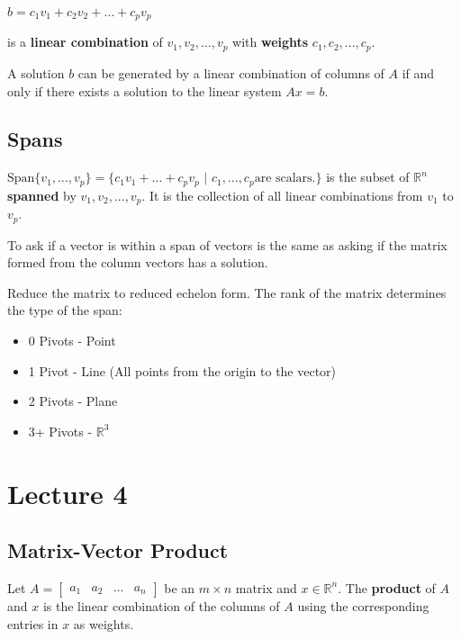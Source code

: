 \documentclass[12pt, letterpaper]{article}
\begin{document}
\medskip
{\centering

  $ b = c_1v_1 + c_2v_2 + \hdots + c_pv_p $

}
\medskip

is a \textbf{linear combination} of $ v_1, v_2, \hdots , v_p $ with
\textbf{weights} $ c_1, c_2, ... , c_p $.

\bigskip

A solution $ b $ can be generated by a linear combination of columns
of $ A $ if and only if there exists a solution to the linear system $ Ax = b $.


\subsection*{Spans}

$ \textrm{Span} \{ v_1, \hdots, v_p \} = \{ c_1v_1 + ... + c_pv_p
\hspace{4pt} | \hspace{4pt} c_1, ..., c_p \textrm{are scalars.}\} $
is the subset of $ \mathbb{R}^n $ \textbf{spanned} by $ v_1, v_2,
..., v_p $. It is the collection of all linear combinations from $
v_1 $ to $ v_p $.

To ask if a vector is within a span of vectors is the same as asking
if the matrix formed from the column vectors has a solution.


\bigskip

Reduce the matrix to reduced echelon form. The rank of the matrix
determines the type of the span:
\begin{itemize}
  \item 0 Pivots - Point
  \item 1 Pivot - Line (All points from the origin to the vector)
  \item 2 Pivots - Plane
  \item 3+ Pivots - $ \mathbb{R}^3 $
\end{itemize}

\section*{Lecture 4}

\subsection*{Matrix-Vector Product}

Let $ A =
\begin{bmatrix}
  a_1 & a_2 & \hdots & a_n
\end{bmatrix} $ be an $ m \times n $ matrix and $ x \in \mathbb{R}^n
$. The \textbf{product} of $ A $ and $ x $ is the linear combination
of the columns of $ A $ using the corresponding entries in $ x $ as weights.
\end{document}
